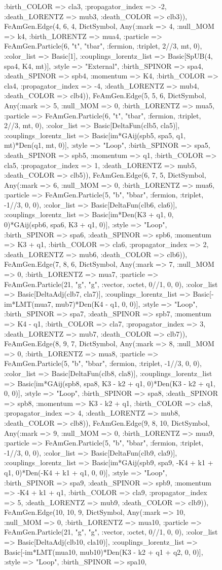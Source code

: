 \documentclass{revtex4}
\begin{document}
\begin{figure}[!htb]
\begin{center}
{:birth_COLOR => cla3, :propagator_index => -2, :death_LORENTZ => mub3, :death_COLOR => clb3)), FeAmGen.Edge(4, 6, 4, Dict{Symbol, Any}(:mark => 4, :null_MOM => k4, :birth_LORENTZ => mua4, :particle => FeAmGen.Particle(6, "t", "tbar", :fermion, :triplet, 2//3, mt, 0), :color_list => Basic[1], :couplings_lorentz_list => Basic[SpUB(4, spa4, K4, mt)], :style => "External", :birth_SPINOR => spa4, :death_SPINOR => spb4, :momentum => K4, :birth_COLOR => cla4, :propagator_index => -4, :death_LORENTZ => mub4, :death_COLOR => clb4)), FeAmGen.Edge(5, 5, 6, Dict{Symbol, Any}(:mark => 5, :null_MOM => 0, :birth_LORENTZ => mua5, :particle => FeAmGen.Particle(6, "t", "tbar", :fermion, :triplet, 2//3, mt, 0), :color_list => Basic[DeltaFun(clb5, cla5)], :couplings_lorentz_list => Basic[im*GAij(spb5, spa5, q1, mt)*Den(q1, mt, 0)], :style => "Loop", :birth_SPINOR => spa5, :death_SPINOR => spb5, :momentum => q1, :birth_COLOR => cla5, :propagator_index => 1, :death_LORENTZ => mub5, :death_COLOR => clb5)), FeAmGen.Edge(6, 7, 5, Dict{Symbol, Any}(:mark => 6, :null_MOM => 0, :birth_LORENTZ => mua6, :particle => FeAmGen.Particle(5, "b", "bbar", :fermion, :triplet, -1//3, 0, 0), :color_list => Basic[DeltaFun(clb6, cla6)], :couplings_lorentz_list => Basic[im*Den(K3 + q1, 0, 0)*GAij(spb6, spa6, K3 + q1, 0)], :style => "Loop", :birth_SPINOR => spa6, :death_SPINOR => spb6, :momentum => K3 + q1, :birth_COLOR => cla6, :propagator_index => 2, :death_LORENTZ => mub6, :death_COLOR => clb6)), FeAmGen.Edge(7, 8, 6, Dict{Symbol, Any}(:mark => 7, :null_MOM => 0, :birth_LORENTZ => mua7, :particle => FeAmGen.Particle(21, "g", "g", :vector, :octet, 0//1, 0, 0), :color_list => Basic[DeltaAdj(clb7, cla7)], :couplings_lorentz_list => Basic[-im*LMT(mua7, mub7)*Den(K4 - q1, 0, 0)], :style => "Loop", :birth_SPINOR => spa7, :death_SPINOR => spb7, :momentum => K4 - q1, :birth_COLOR => cla7, :propagator_index => 3, :death_LORENTZ => mub7, :death_COLOR => clb7)), FeAmGen.Edge(8, 9, 7, Dict{Symbol, Any}(:mark => 8, :null_MOM => 0, :birth_LORENTZ => mua8, :particle => FeAmGen.Particle(5, "b", "bbar", :fermion, :triplet, -1//3, 0, 0), :color_list => Basic[DeltaFun(clb8, cla8)], :couplings_lorentz_list => Basic[im*GAij(spb8, spa8, K3 - k2 + q1, 0)*Den(K3 - k2 + q1, 0, 0)], :style => "Loop", :birth_SPINOR => spa8, :death_SPINOR => spb8, :momentum => K3 - k2 + q1, :birth_COLOR => cla8, :propagator_index => 4, :death_LORENTZ => mub8, :death_COLOR => clb8)), FeAmGen.Edge(9, 8, 10, Dict{Symbol, Any}(:mark => 9, :null_MOM => 0, :birth_LORENTZ => mua9, :particle => FeAmGen.Particle(5, "b", "bbar", :fermion, :triplet, -1//3, 0, 0), :color_list => Basic[DeltaFun(clb9, cla9)], :couplings_lorentz_list => Basic[im*GAij(spb9, spa9, -K4 + k1 + q1, 0)*Den(-K4 + k1 + q1, 0, 0)], :style => "Loop", :birth_SPINOR => spa9, :death_SPINOR => spb9, :momentum => -K4 + k1 + q1, :birth_COLOR => cla9, :propagator_index => 5, :death_LORENTZ => mub9, :death_COLOR => clb9)), FeAmGen.Edge(10, 10, 9, Dict{Symbol, Any}(:mark => 10, :null_MOM => 0, :birth_LORENTZ => mua10, :particle => FeAmGen.Particle(21, "g", "g", :vector, :octet, 0//1, 0, 0), :color_list => Basic[DeltaAdj(clb10, cla10)], :couplings_lorentz_list => Basic[-im*LMT(mua10, mub10)*Den(K3 - k2 + q1 + q2, 0, 0)], :style => "Loop", :birth_SPINOR => spa10, }
\end{center}
\end{figure}
\end{document}
